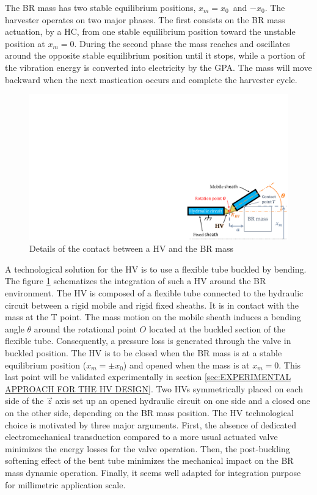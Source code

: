 \documentclass[3p,twocolumn,preprint]{elsarticle}
\begin{document}
The BR mass has two stable equilibrium positions, \mbox{$x_m = x_0$ }and \mbox{$-x_0$}. The harvester operates on two major phases. The first consists on the BR mass actuation, by a HC, from one stable equilibrium position toward the unstable position at $x_m = 0$. During the second phase the mass reaches and oscillates around the opposite stable equilibrium position until it stops, while a portion of the vibration energy is converted into electricity by the GPA. The mass will move backward when the next mastication occurs and complete the harvester cycle.
\begin{figure}[!htbp]
	\centering
	\captionsetup{justification=centering}
	\includegraphics[trim={20.5cm 0cm 0cm 11.5cm},clip, width=0.8\linewidth]{figures/HV_actuation_detail.pdf}
	\caption{Details of the contact between a HV and the BR mass} 
	\label{fig:HV_actuation_detail}
\end{figure}

A technological solution for the HV is to use a flexible tube buckled by bending. The figure \ref{fig:HV_actuation_detail} schematizes the integration of such a HV around the BR environment. The HV is composed of a flexible tube connected to the hydraulic circuit between a rigid mobile and rigid fixed sheaths. It is in contact with the mass at the T point. The mass motion on the mobile sheath induces a bending angle $\theta$ around the rotational point $O$ located at the buckled section of the flexible tube. Consequently, a pressure loss is generated through the valve in buckled position. The HV is to be closed when the BR mass is at a stable equilibrium position ($x_m=\pm x_0$) and opened when the mass is at $x_m=0$. This last point will be validated experimentally in section \ref{sec:EXPERIMENTAL APPROACH FOR THE HV DESIGN}. Two HVs symmetrically placed on each side of the $\vec{z}$ axis set up an opened hydraulic circuit on one side and a closed one on the other side, depending on the BR mass position. The HV technological choice is motivated by three major arguments. First, the absence of dedicated electromechanical transduction compared to a more usual actuated valve minimizes the energy losses for the valve operation. Then, the post-buckling softening effect of the bent tube minimizes the mechanical impact on the BR mass dynamic operation. Finally, it seems well adapted for integration purpose for millimetric application scale.
\end{document}
